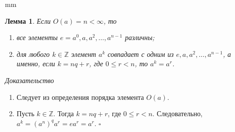 \documentclass[12pt,english,russian]{article}
\newtheorem{lemma}{Лемма}
\begin{document}
	 mm
	\begin{lemma}
		Если $O(a) = n < \infty$, то
		\begin{enumerate}
			\item все элементы $e = a^0,a,a^2,\dots ,a^{n-1}$ различны;
			\item для любого $k \in \mathbb{Z}$ элемент $a^k$ совпадает с одним из
			$e,a,a^2,\dots ,a^{n-1}$, а именно, если $k=nq+r$, где
			$0 \leq r < n$, то $a^k=a^r$.
		\end{enumerate}
	\end{lemma}
	\textit{Доказательство}
	\begin{enumerate}
		\item Следует из определения порядка элемента $O(a)$.
		\item Пусть $k \in \mathbb{Z}$. Тогда $k=nq+r$, где $0 \leq r < n$. 
		Следовательно, $a^k = (a^n)^qa^r = ea^r = a^r$. \quad $\square$
	\end{enumerate}
	
	
	
	
	
	
	
	
	
\end{document}
